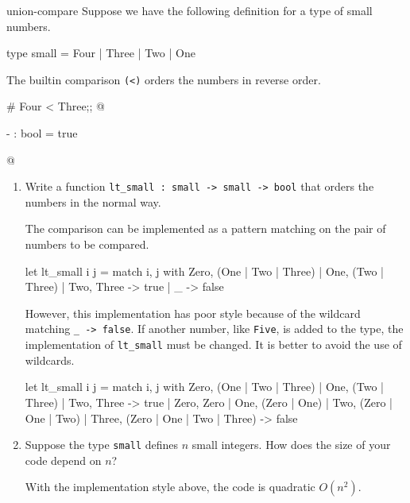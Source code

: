 %
\begin{exercise}{union-compare}
Suppose we have the following definition for a type of small numbers.

\begin{ocaml}
type small = Four | Three | Two | One
\end{ocaml}
%
The builtin comparison \hbox{\lstinline/(<)/} orders the numbers in reverse order.

\begin{ocaml}
# Four < Three;;
@
\begin{topoutput}
- : bool = true
\end{topoutput}
@
\end{ocaml}
%
\begin{enumerate}
\item
Write a function \hbox{\lstinline/lt_small : small -> small -> bool/} that orders the numbers in the
normal way.

\begin{answer}\ifanswers
The comparison can be implemented as a pattern matching on the pair of numbers to be compared.

\begin{ocaml}
let lt_small i j =
   match i, j with
      Zero, (One | Two | Three)
    | One, (Two | Three)
    | Two, Three ->
         true
    | _ ->
         false
\end{ocaml}
%
However, this implementation has poor style because of the wildcard matching \hbox{\lstinline/_ -> false/}.
If another number, like \hbox{\lstinline/Five/}, is added to the type, the implementation of
\hbox{\lstinline/lt_small/} must be changed.  It is better to avoid the use of wildcards.

\begin{ocaml}
let lt_small i j =
   match i, j with
      Zero, (One | Two | Three)
    | One, (Two | Three)
    | Two, Three ->
         true
    | Zero, Zero
    | One, (Zero | One)
    | Two, (Zero | One | Two)
    | Three, (Zero | One | Two | Three) ->
         false
\end{ocaml}
\fi\end{answer}

\item

Suppose the type \hbox{\lstinline/small/} defines $n$ small integers.  How does the size of your code depend on $n$?

\begin{answer}\ifanswers
With the implementation style above, the code is quadratic $O(n^2)$.


\end{answer}
\end{enumerate}
\end{exercise}
